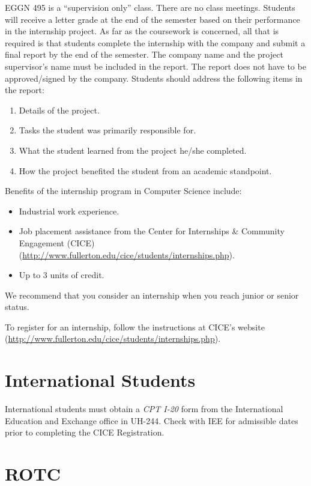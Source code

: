 \documentclass{book}
\begin{document}
EGGN 495 is a ``supervision only'' class. There are no class meetings. Students will receive a letter grade at the end of the semester based on their performance in the internship project. As far as the coursework is concerned, all that is required is that students complete the internship with the company and submit a final report by the end of the semester. The company name and the project supervisor's name must be included in the report. The report does not have to be approved/signed by the company. Students should address the following items in the report:
\begin{enumerate}
\item Details of the project.
\item Tasks the student was primarily responsible for.
\item What the student learned from the project he/she completed.
\item How the project benefited the student from an academic standpoint.
\end{enumerate}

Benefits of the internship program in Computer Science include:
\begin{itemize}
\item Industrial work experience.
\item Job placement assistance from the Center for Internships \& Community Engagement (CICE) (\url{http://www.fullerton.edu/cice/students/internships.php}).
\item Up to 3 units of credit.
\end{itemize}

We recommend that you consider an internship when you reach junior or senior status.

To register for an internship, follow the instructions at CICE's website (\url{http://www.fullerton.edu/cice/students/internships.php}).

\section{International Students}

International students must obtain a \emph{CPT I-20} form from the International Education and Exchange office in UH-244. Check with IEE for admissible dates prior to completing the CICE Registration.

\section{ROTC}
\end{document}
